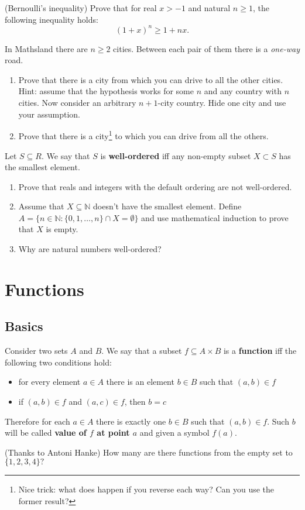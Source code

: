 \begin{prob}
	(Bernoulli's inequality) Prove that for real $x > -1$ and natural $n\ge 1$, the following inequality holds:
	$$(1+x)^n\ge 1+nx.$$
\end{prob}

\begin{prob}
	In Mathsland there are $n\ge 2$ cities. Between each pair of them there is a \textit{one-way} road.
	\begin{enumerate}
		\item Prove that there is a city from which you can drive to all the other cities. Hint: assume that the hypothesis works for some $n$ and any
			country with $n$ cities. Now consider an arbitrary $n+1$-city country. Hide one city and use your assumption.
		\item Prove that there is a city\footnote{Nice trick: what does happen if you reverse each way? Can you use the former result?}
			to which you can drive from all the others.
	\end{enumerate}
\end{prob}

\begin{prob}
	Let $S\subseteq R$. We say that $S$ is \textbf{well-ordered} iff any non-empty subset $X\subset S$ has the smallest element.
	\begin{enumerate}
		\item Prove that reals and integers with the default ordering are not well-ordered.
		\item Assume that $X\subseteq \mathbb N$ doesn't have the smallest element. Define $A=\{n\in \mathbb N : \{0,1,\dots,n\}\cap X=\emptyset\}$
			and use mathematical induction to prove that $X$ is empty.
		\item Why are natural numbers well-ordered?
	\end{enumerate}
\end{prob}

\section{Functions}
\label{sec:intro_to_functions}

\subsection{Basics}
\noindent Consider two sets $A$ and $B$. We say that a subset $f\subseteq A\times B$ is a \textbf{function}
iff the following two conditions hold:
\begin{itemize}
	\item for every element $a\in A$ there is an element $b\in B$ such that $(a,b)\in f$
	\item if $(a,b)\in f$ and $(a,c)\in f$, then $b=c$
\end{itemize}
Therefore for each $a\in A$ there is exactly one $b\in B$ such that $(a,b)\in f$. Such $b$ will be called
\textbf{value of $f$ at point $a$} and given a symbol $f(a).$
\begin{prob}
	(Thanks to Antoni Hanke) How many are there functions from the empty set to $\{1,2,3,4\}?$
\end{prob}

